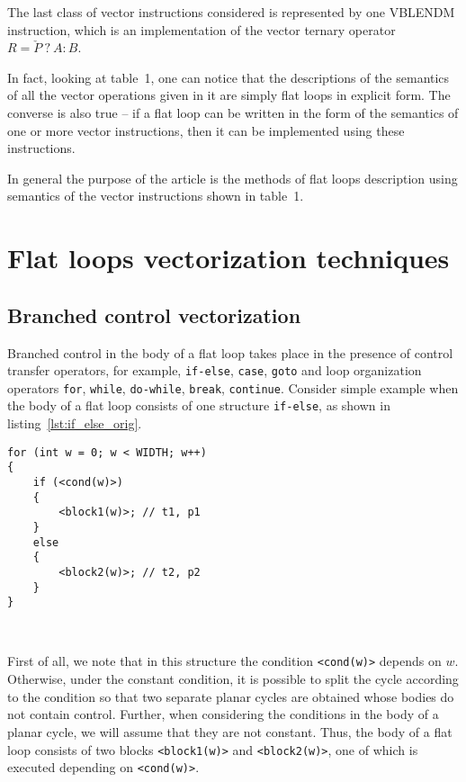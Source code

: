 \documentclass[
11pt,%
tightenlines,%
twoside,%
onecolumn,%
nofloats,%
nobibnotes,%
nofootinbib,%
superscriptaddress,%
noshowpacs,%
centertags]%
{revtex4}
\begin{document}
The last class of vector instructions considered is represented by one VBLENDM instruction, which is an implementation of the vector ternary operator $R = \check{P} \ ? \ A : B$.

In fact, looking at table~1, one can notice that the descriptions of the semantics of all the vector operations given in it are simply flat loops in explicit form.
The converse is also true -- if a flat loop can be written in the form of the semantics of one or more vector instructions, then it can be implemented using these instructions.

In general the purpose of the article is the methods of flat loops description using semantics of the vector instructions shown in table~1.

\section{Flat loops vectorization techniques}

\subsection{Branched control vectorization}

Branched control in the body of a flat loop takes place in the presence of control transfer operators, for example, \texttt{if-else}, \texttt{case}, \texttt{goto} and loop organization operators \texttt{for}, \texttt{while}, \texttt{do-while}, \texttt{break}, \texttt{continue}.
Consider simple example when the body of a flat loop consists of one structure \texttt{if-else}, as shown in listing~\ref{lst:if_else_orig}.

\begin{lstlisting}[caption={The body of a flat loop, consisting of \texttt{if-else} structure.},label={lst:if_else_orig}]
for (int w = 0; w < WIDTH; w++)
{
    if (<cond(w)>)
    {
        <block1(w)>; // t1, p1
    }
    else
    {
        <block2(w)>; // t2, p2
    }
}
\end{lstlisting}

\

First of all, we note that in this structure the condition \texttt {<cond(w)>} depends on $w$.
Otherwise, under the constant condition, it is possible to split the cycle according to the condition so that two separate planar cycles are obtained whose bodies do not contain control.
Further, when considering the conditions in the body of a planar cycle, we will assume that they are not constant.
Thus, the body of a flat loop consists of two blocks \texttt{<block1(w)>} and \texttt{<block2(w)>}, one of which is executed depending on \texttt{<cond(w)>}.
\end{document}

